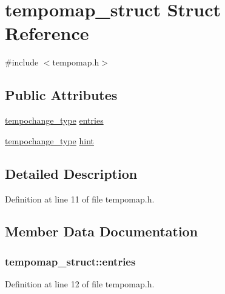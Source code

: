 \hypertarget{structtempomap__struct}{}\section{tempomap\+\_\+struct Struct Reference}
\label{structtempomap__struct}


{\ttfamily \#include $<$tempomap.\+h$>$}

\subsection*{Public Attributes}
\begin{DoxyCompactItemize}
\item 
\hyperlink{tempomap_8h_ac0de2328b9770e0912b439361398b4ad}{tempochange\+\_\+type} \hyperlink{structtempomap__struct_a73e9051fdcacf105df78f571a2033a4e}{entries}
\item 
\hyperlink{tempomap_8h_ac0de2328b9770e0912b439361398b4ad}{tempochange\+\_\+type} \hyperlink{structtempomap__struct_a6b20b46e84c4f0a327b1125e2acce8c2}{hint}
\end{DoxyCompactItemize}


\subsection{Detailed Description}


Definition at line 11 of file tempomap.\+h.



\subsection{Member Data Documentation}
\subsubsection[{\texorpdfstring{entries}{entries}}]{ tempomap\+\_\+struct\+::entries}\hypertarget{structtempomap__struct_a73e9051fdcacf105df78f571a2033a4e}{}\label{structtempomap__struct_a73e9051fdcacf105df78f571a2033a4e}


Definition at line 12 of file tempomap.\+h.


